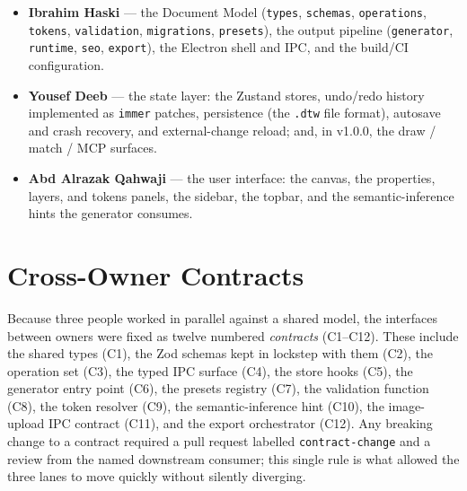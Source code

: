 \begin{itemize}[leftmargin=1.5em]
  \item \textbf{Ibrahim Haski} --- the Document Model
        (\texttt{types}, \texttt{schemas}, \texttt{operations}, \texttt{tokens},
        \texttt{validation}, \texttt{migrations}, \texttt{presets}), the output
        pipeline (\texttt{generator}, \texttt{runtime}, \texttt{seo},
        \texttt{export}), the Electron shell and IPC, and the build/CI
        configuration.
  \item \textbf{Yousef Deeb} --- the state layer: the Zustand stores, undo/redo
        history implemented as \texttt{immer} patches, persistence
        (the \texttt{.dtw} file format), autosave and crash recovery, and
        external-change reload; and, in v1.0.0, the draw / match / MCP surfaces.
  \item \textbf{Abd Alrazak Qahwaji} --- the user interface: the canvas, the
        properties, layers, and tokens panels, the sidebar, the topbar, and the
        semantic-inference hints the generator consumes.
\end{itemize}

\section{Cross-Owner Contracts}
Because three people worked in parallel against a shared model, the interfaces
between owners were fixed as twelve numbered \emph{contracts} (C1--C12). These
include the shared types (C1), the Zod schemas kept in lockstep with them (C2), the
operation set (C3), the typed IPC surface (C4), the store hooks (C5), the generator
entry point (C6), the presets registry (C7), the validation function (C8), the
token resolver (C9), the semantic-inference hint (C10), the image-upload IPC
contract (C11), and the export orchestrator (C12). Any breaking change to a
contract required a pull request labelled \texttt{contract-change} and a review
from the named downstream consumer; this single rule is what allowed the three
lanes to move quickly without silently diverging.

